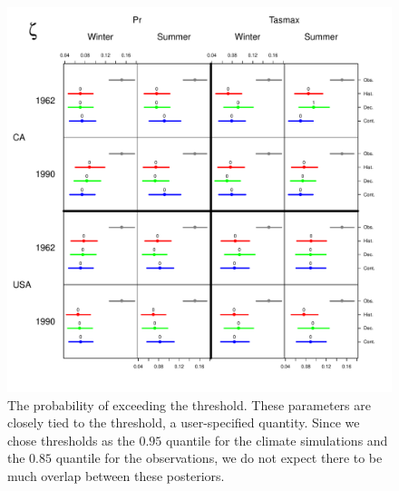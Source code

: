 \begin{figure}
\begin{center}
 \includegraphics[scale=0.72]{figs/zeta.pdf}
\end{center}
\caption{The probability of exceeding the threshold. These parameters are closely tied to the threshold, a user-specified quantity. Since we chose thresholds as the $0.95$ quantile for the climate simulations and the $0.85$ quantile for the observations, we do not expect there to be much overlap between these posteriors.}
\label{zeta}
\end{figure}

